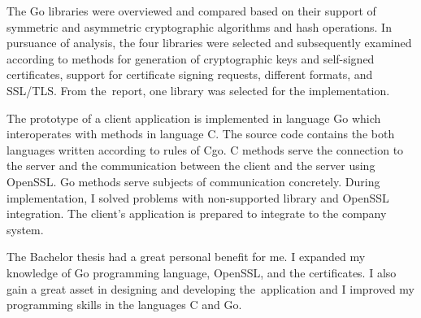 \documentclass[
  oneside, 12pt, 
  printed, %
  notable,   %
  nolof,     %
  nolot,     %
]{fithesis3}
\begin{document}
The Go libraries were overviewed and compared based on their support of symmetric and asymmetric 
cryptographic algorithms and hash operations. In pursuance of analysis, the four libraries were 
selected and subsequently examined according to methods for generation of cryptographic keys and 
self-signed certificates, support for certificate signing requests, different formats, and 
SSL/TLS. From the~report, one library was selected for the implementation.

The prototype of a client application is implemented in language Go which interoperates with 
methods in language C. The source code contains the both languages written according to rules of 
Cgo. C methods serve the connection to the server and the communication between the client and 
the server using OpenSSL. Go methods serve subjects of communication concretely. During 
implementation, I solved problems with non-supported library and OpenSSL integration. The 
client's application is prepared to integrate to the company system.

The Bachelor thesis had a great personal benefit for me. I expanded my knowledge of Go 
programming language, OpenSSL, and the certificates. I also gain a great asset in designing and 
developing the~application and I improved my programming skills in the languages C and Go. 



\printbibliography
\end{document}
